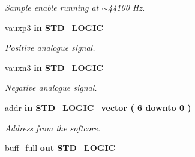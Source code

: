 \begin{DoxyCompactItemize}
\begin{DoxyCompactList}\small\item\em Sample enable running at $\sim$44100 Hz. \end{DoxyCompactList}\item 
\hypertarget{classADC__TOP_af2205ffee98e5aeaa144186159740393}{\hyperlink{classADC__TOP_af2205ffee98e5aeaa144186159740393}{vauxp3}  {\bfseries {\bfseries \textcolor{vhdlkeyword}{in}\textcolor{vhdlchar}{ }}} {\bfseries \textcolor{comment}{S\-T\-D\-\_\-\-L\-O\-G\-I\-C}\textcolor{vhdlchar}{ }} }\label{classADC__TOP_af2205ffee98e5aeaa144186159740393}

\begin{DoxyCompactList}\small\item\em Positive analogue signal. \end{DoxyCompactList}\item 
\hypertarget{classADC__TOP_a3d034bd2912bb721a5bd221c185c5c99}{\hyperlink{classADC__TOP_a3d034bd2912bb721a5bd221c185c5c99}{vauxn3}  {\bfseries {\bfseries \textcolor{vhdlkeyword}{in}\textcolor{vhdlchar}{ }}} {\bfseries \textcolor{comment}{S\-T\-D\-\_\-\-L\-O\-G\-I\-C}\textcolor{vhdlchar}{ }} }\label{classADC__TOP_a3d034bd2912bb721a5bd221c185c5c99}

\begin{DoxyCompactList}\small\item\em Negative analogue signal. \end{DoxyCompactList}\item 
\hypertarget{classADC__TOP_a57ff14de06cd6f4e021faa435aae362b}{\hyperlink{classADC__TOP_a57ff14de06cd6f4e021faa435aae362b}{addr}  {\bfseries {\bfseries \textcolor{vhdlkeyword}{in}\textcolor{vhdlchar}{ }}} {\bfseries \textcolor{comment}{S\-T\-D\-\_\-\-L\-O\-G\-I\-C\-\_\-vector}\textcolor{vhdlchar}{ }\textcolor{vhdlchar}{(}\textcolor{vhdlchar}{ }\textcolor{vhdlchar}{ } \textcolor{vhdldigit}{6} \textcolor{vhdlchar}{ }\textcolor{vhdlchar}{ }\textcolor{vhdlchar}{ }\textcolor{vhdlkeyword}{downto}\textcolor{vhdlchar}{ }\textcolor{vhdlchar}{ }\textcolor{vhdlchar}{ } \textcolor{vhdldigit}{0} \textcolor{vhdlchar}{ }\textcolor{vhdlchar}{)}\textcolor{vhdlchar}{ }} }\label{classADC__TOP_a57ff14de06cd6f4e021faa435aae362b}

\begin{DoxyCompactList}\small\item\em Address from the softcore. \end{DoxyCompactList}\item 
\hypertarget{classADC__TOP_a1db73b91cf59fc8a5c0e360bbc004989}{\hyperlink{classADC__TOP_a1db73b91cf59fc8a5c0e360bbc004989}{buff\-\_\-full}  {\bfseries {\bfseries \textcolor{vhdlkeyword}{out}\textcolor{vhdlchar}{ }}} {\bfseries \textcolor{comment}{S\-T\-D\-\_\-\-L\-O\-G\-I\-C}\textcolor{vhdlchar}{ }} }\label{classADC__TOP_a1db73b91cf59fc8a5c0e360bbc004989}


\end{DoxyCompactItemize}
